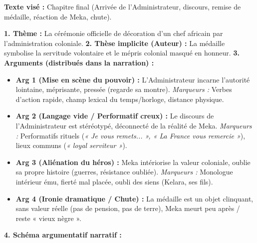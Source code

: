 \documentclass[11pt]{article}
\begin{document}
\begin{exoresolu}
\textbf{Texte visé :} Chapitre final (Arrivée de l'Administrateur, discours, remise de médaille, réaction de Meka, chute).

\textbf{1. Thème :} La cérémonie officielle de décoration d'un chef africain par l'administration coloniale.
\textbf{2. Thèse implicite (Auteur) :} La médaille symbolise la servitude volontaire et le mépris colonial masqué en honneur.
\textbf{3. Arguments (distribués dans la narration) :}
\begin{itemize}
    \item \textbf{Arg 1 (Mise en scène du pouvoir) :} L'Administrateur incarne l'autorité lointaine, méprisante, pressée (regarde sa montre). \emph{Marqueurs :} Verbes d'action rapide, champ lexical du temps/horloge, distance physique.
    \item \textbf{Arg 2 (Langage vide / Performatif creux) :} Le discours de l'Administrateur est stéréotypé, déconnecté de la réalité de Meka. \emph{Marqueurs :} Performatifs rituels (\emph{« Je vous remets... », « La France vous remercie »}), lieux communs (\emph{« loyal serviteur »}).
    \item \textbf{Arg 3 (Aliénation du héros) :} Meka intériorise la valeur coloniale, oublie sa propre histoire (guerres, résistance oubliée). \emph{Marqueurs :} Monologue intérieur ému, fierté mal placée, oubli des siens (Kelara, ses fils).
    \item \textbf{Arg 4 (Ironie dramatique / Chute) :} La médaille est un objet clinquant, sans valeur réelle (pas de pension, pas de terre), Meka meurt peu après / reste « vieux nègre ».
\end{itemize}
\textbf{4. Schéma argumentatif narratif :}
\begin{center}
\begin{center}\end{center}
\vspace{-2pt}
\begin{tcbraster}[raster columns=2,raster equal height=rows,raster column skip=6pt,raster row skip=6pt,enhanced,blankest]
\begin{tcolorbox}[enhanced,colback=white,colframe=popblue,boxrule=0.9pt,arc=3pt,title={ARG 1 Mise en scène pouvoir colonial},fonttitle=\bfseries\scriptsize,coltitle=white,colbacktitle=popblue,left=4pt,right=4pt,top=2pt,bottom=2pt,boxsep=1pt,toptitle=1.5pt,bottomtitle=1.5pt,halign=left]

\end{tcolorbox}
\end{tcbraster}
\end{center}
\end{exoresolu}
\end{document}
